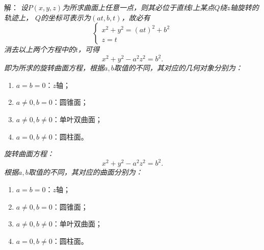 \begin{frame}
	\linespread{1.5}
	
	\bigskip
	
	\small 解：\it
	设$P(x,y,z)$为所求曲面上任意一点，则其必位于直线$l$上某点$Q$绕$z$轴旋转的轨迹上，
	$Q$的坐标可表示为$(at,b,t)$，故必有
	$$\left\{\begin{array}{l}
		x^2+y^2=(at)^2+b^2\\
		z=t
	\end{array}\right.$$
	消去以上两个方程中的$t$，可得
	$$x^2+y^2-a^2z^2=b^2.$$
	即为所求的旋转曲面方程，根据$a,b$取值的不同，其对应的几何对象分别为：
	\begin{enumerate}[(1)]
	  \setlength{\itemindent}{1cm}
	  \item $a=b=0$：$z$轴；
	  \item $a\ne0,b=0$：圆锥面；
	  \item $a\ne0,b\ne0$：单叶双曲面；
	  \item $a=0,b\ne0$：圆柱面。
	\end{enumerate}
	\fin
\end{frame}

\begin{frame}
	\linespread{1.5}
	
	
	\small \it
	旋转曲面方程：
	$$x^2+y^2-a^2z^2=b^2.$$
	根据$a,b$取值的不同，其对应的曲面分别为：
	\begin{enumerate}[(1)]
	  \setlength{\itemindent}{1cm}
	  \item $a=b=0$：$z$轴；
	  \item $a\ne0,b=0$：圆锥面；
	  \item $a\ne0,b\ne0$：单叶双曲面；
	  \item $a=0,b\ne0$：圆柱面。
	\end{enumerate}
	\fin
\end{frame}

